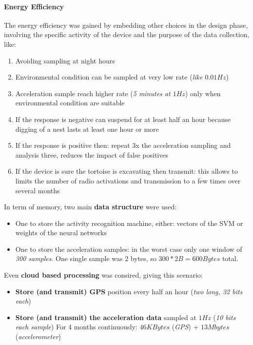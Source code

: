 \documentclass[10pt,a4paper]{report}
\theoremstyle{definition}
\begin{document}
\paragraph{Energy Efficiency}\label{sec:energy-efficiency}
The energy efficiency was gained by embedding other choices in the design phase, involving the specific activity of the device and the purpose of the data collection, like:
\begin{enumerate}
	\item 
	Avoiding sampling at night hours
	\item 
	Environmental condition can be sampled at very low rate (\textit{like $0.01Hz$})
	\item 
	Acceleration sample reach higher rate (\textit{5 minutes at $1Hz$}) only when environmental condition are suitable
	\item 
	If the response is negative can suspend for at least half an hour because digging of a nest lasts at least one hour or more
	\item 
	If the response is positive then: repeat 3x the acceleration sampling and analysis three, reduces the impact of false positives
	\item 
	If the device is sure the tortoise is excavating then transmit: this allows to limits the number of radio activations and transmission to a few times over several months
\end{enumerate}

In term of memory, two main \textbf{data structure} were used:
\begin{itemize}
	\item 
	One to store the activity recognition machine, either: vectors of the SVM or weights of the neural networks
	\item One to store the acceleration samples: in the worst case only one window of \textit{300 samples}. One single sample was 2 bytes, so $300*2B= 600 Bytes$ total.
\end{itemize}

Even \textbf{cloud based processing} was consired, giving this scenario:
\begin{itemize}
	\item 
	\textbf{Store (and transmit) GPS} position every half an hour (\textit{two long, 32 bits each})
	\item 
	\textbf{Store (and transmit) the acceleration data} sampled at $1Hz$ (\textit{10 bits each sample})
	For 4 months continuously: $46 KBytes$ (\textit{GPS}) + $13 Mbytes$ (\textit{accelerometer})
\end{itemize}
\end{document}
